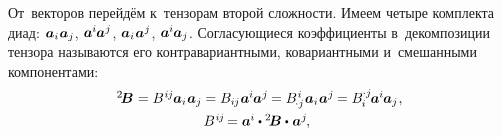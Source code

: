 \begin{otherlanguage}{russian}
От~векторов перейдём к~тензорам второй сложности. Имеем четыре комплекта диад:
${\bm{a}_i \hspace{0.1ex} \bm{a}_j}$,
\hbox{$\bm{a}^{\hspace{-0.05ex}i} \hspace{-0.1ex} \bm{a}^{\hspace{0.05ex}j}$\hspace{-0.25ex},}
\hbox{$\bm{a}_i \hspace{0.1ex} \bm{a}^{\hspace{0.05ex}j}$\hspace{-0.25ex},}
${\bm{a}^{\hspace{-0.05ex}i} \hspace{-0.1ex} \bm{a}_j}$.
Согласующиеся коэффициенты в~декомпозиции тензора называются его контра\-вариант\-ными, ко\-вариант\-ными и~смешан\-ными компонентами:
\vspace{0.1em}\begin{equation}\begin{array}{c}
{^2\!\bm{B}} \hspace{0.1ex} =
B^{\hspace{0.1ex}i\hspace{-0.1ex}j} \hspace{-0.1ex} \bm{a}_i \hspace{0.1ex} \bm{a}_j \hspace{-0.05ex} =
B_{i\hspace{-0.1ex}j} \hspace{0.1ex} \bm{a}^{\hspace{-0.05ex}i} \hspace{-0.1ex} \bm{a}^{\hspace{0.05ex}j} \hspace{-0.15ex} =
B_{\hspace{-0.2ex} \cdot j}^{\hspace{0.1ex}i} \hspace{0.1ex} \bm{a}_i \hspace{0.1ex} \bm{a}^{\hspace{0.05ex}j} \hspace{-0.15ex} =
B_{\hspace{-0.1ex}i}^{\hspace{-0.05ex} \cdot j} \hspace{-0.2ex} \bm{a}^{\hspace{-0.05ex}i} \hspace{-0.1ex} \bm{a}_j \hspace{0.1ex}, \\[0.4em]
%
B^{\hspace{0.1ex}i\hspace{-0.1ex}j} \hspace{-0.25ex} = \bm{a}^{\hspace{-0.05ex}i} \dotp {^2\!\bm{B}} \dotp \hspace{0.1ex} \bm{a}^{\hspace{0.05ex}j} \hspace{-0.2ex}, \:\,

\end{array}
\end{equation}
\end{otherlanguage}
